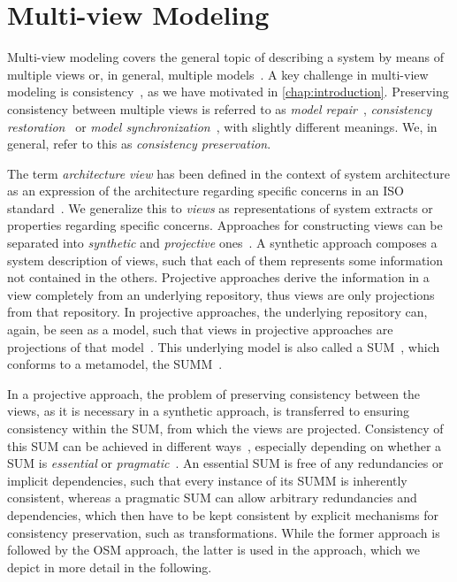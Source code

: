 \section{Multi-view Modeling}
\label{chap:foundations:multiview}

Multi-view modeling covers the general topic of describing a system by means of multiple views or, in general, multiple models~\cite{reineke2019ProblemMultiView-SoSym}.
A key challenge in multi-view modeling is consistency~\cite{reineke2019ProblemMultiView-SoSym}, as we have motivated in \autoref{chap:introduction}.
Preserving consistency between multiple views is referred to as \emph{model repair}~\cite{macedo2017ModelRepairClassification-TSE}, \emph{consistency restoration}~\cite{stevens2010sosym, kramer2017a} or \emph{model synchronization}~\cite{diskin2016Taxonomy-JSS}, with slightly different meanings.
We, in general, refer to this as \emph{consistency preservation}.

The term \emph{architecture view} has been defined in the context of system architecture as an expression of the architecture regarding specific concerns in an ISO standard~\cite[p.~2]{iso42010}.
We generalize this to \emph{views} as representations of system extracts or properties regarding specific concerns.
Approaches for constructing views can be separated into \emph{synthetic} and \emph{projective} ones~\cite[p.~22]{iso42010}.
A synthetic approach composes a system description of views, such that each of them represents some information not contained in the others.
Projective approaches derive the information in a view completely from an underlying repository, thus views are only projections from that repository.
In projective approaches, the underlying repository can, again, be seen as a model, such that views in projective approaches are projections of that model~\cite[Fig.~5]{klare2020Vitruv-JSS}.
This underlying model is also called a \gls{SUM}~\cite[p.~210]{atkinson2010a}, which conforms to a metamodel, the \gls{SUMM}~.

In a projective approach, the problem of preserving consistency between the views, as it is necessary in a synthetic approach, is transferred to ensuring consistency within the \gls{SUM}, from which the views are projected.
Consistency of this \gls{SUM} can be achieved in different ways~, especially depending on whether a \gls{SUM} is \emph{essential} or \emph{pragmatic}~\cite{atkinson2015realizationMultiView-EDOC}.
An essential \gls{SUM} is free of any redundancies or implicit dependencies, such that every instance of its \gls{SUMM} is inherently consistent, whereas a pragmatic \gls{SUM} can allow arbitrary redundancies and dependencies, which then have to be kept consistent by explicit mechanisms for consistency preservation, such as transformations.
While the former approach is followed by the \acrlong{OSM} approach, the latter is used in the \vitruv approach, which we depict in more detail in the following.

